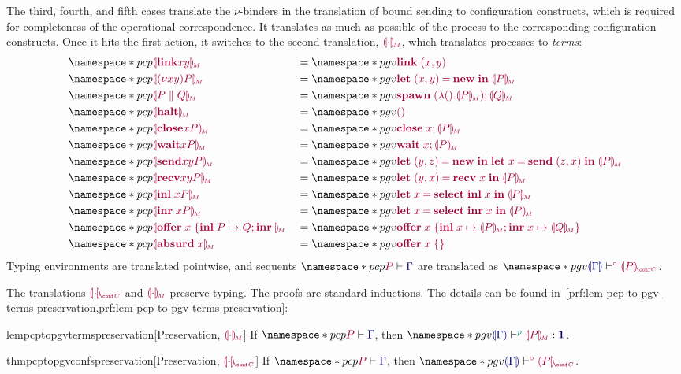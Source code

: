 \documentclass[main.tex]{subfiles}
\begin{document}
The third, fourth, and fifth cases translate the $\nu$-binders in the translation of bound sending to configuration constructs, which is required for completeness of the operational correspondence.
It translates as much as possible of the process to the corresponding configuration constructs. Once it hits the first action, it switches to the second translation, $\tm{\cpgvM{\cdot}}$, which translates processes to \emph{terms}:
\begin{align*}
  &\pcp{\tm{\cpgvM{\link{x}{y}}}}
  &&= \pgv{\tm{\link\;{\pair{x}{y}}}} \\
  &\pcp{\tm{\cpgvM{\res{x}{y}{P}}}}
  &&= \pgv{\tm{\letpair{x}{y}{\new}{\cpgvM{P}}}} \\
  &\pcp{\tm{\cpgvM{\ppar{P}{Q}}}}
  &&= \pgv{\tm{\andthen{\spawn\;{(\lambda\unit.\cpgvM{P})}}{\cpgvM{Q}}}} \\
  &\pcp{\tm{\cpgvM{\halt}}}
  &&= \pgv{\tm{\unit}} \\
  &\pcp{\tm{\cpgvM{\close{x}{P}}}}
  &&= \pgv{\tm{\andthen{\close\;{x}}{\cpgvM{P}}}} \\
  &\pcp{\tm{\cpgvM{\wait{x}{P}}}}
  &&= \pgv{\tm{\andthen{\wait\;{x}}{\cpgvM{P}}}} \\
  &\pcp{\tm{\cpgvM{\send{x}{y}{P}}}}
  &&= \pgv{\tm{\letpair{y}{z}{\new}{\letbind{x}{\send\;{\pair{z}{x}}}{\cpgvM{P}}}}} \\
  &\pcp{\tm{\cpgvM{\recv{x}{y}{P}}}}
  &&= \pgv{\tm{\letpair{y}{x}{\recv\;{x}}{\cpgvM{P}}}} \\
  &\pcp{\tm{\cpgvM{\inl{x}{P}}}}
  &&= \pgv{\tm{\letbind{x}{\select{\labinl}\;{x}}{\cpgvM{P}}}} \\
  &\pcp{\tm{\cpgvM{\inr{x}{P}}}}
  &&= \pgv{\tm{\letbind{x}{\select{\labinr}\;{x}}{\cpgvM{P}}}} \\
  &\pcp{\tm{\cpgvM{\offer{x}{P}{Q}}}}
  &&= \pgv{\tm{\offer{x}{x}{\cpgvM{P}}{x}{\cpgvM{Q}}}} \\
  &\pcp{\tm{\cpgvM{\absurd{x}}}}
  &&= \pgv{\tm{\offeremp{x}}}
\end{align*}
Typing environments are translated pointwise, and sequents $\pcp{\seq{P}{\ty{\Gamma}}}$ are translated as $\pgv{\cseq[\child]{\ty{\cpgvT{\ty{\Gamma}}}}{\cpgvC{P}}}$.

The translations $\tm{\cpgvC{\cdot}}$ and $\tm{\cpgvM{\cdot}}$ preserve typing. The proofs are standard inductions. The details can be found in~\cref{prf:lem-pcp-to-pgv-terms-preservation,prf:lem-pcp-to-pgv-terms-preservation}:
\begin{compacttheorems}
  \begin{restatablelemma}{lempcptopgvtermspreservation}[Preservation, ${\tm{\cpgvM{\cdot}}}$]
    \label{lem:pcp-to-pgv-terms-preservation}
    If $\pcp{\seq{P}{\ty{\Gamma}}}$, then $\pgv{\tseq[\cs{p}]{\ty{\cpgvT{\Gamma}}}{\cpgvM{P}}{\tyunit}}$.
  \end{restatablelemma}
  \begin{restatabletheorem}{thmpcptopgvconfspreservation}[Preservation, ${\tm{\cpgvC{\cdot}}}$]
    \label{thm:pcp-to-pgv-confs-preservation}
    If $\pcp{\seq{P}{\ty{\Gamma}}}$, then $\pgv{\cseq[\child]{\ty{\cpgvT{\Gamma}}}{\cpgvC{P}}}$.
  \end{restatabletheorem}
\end{compacttheorems}
\end{document}
